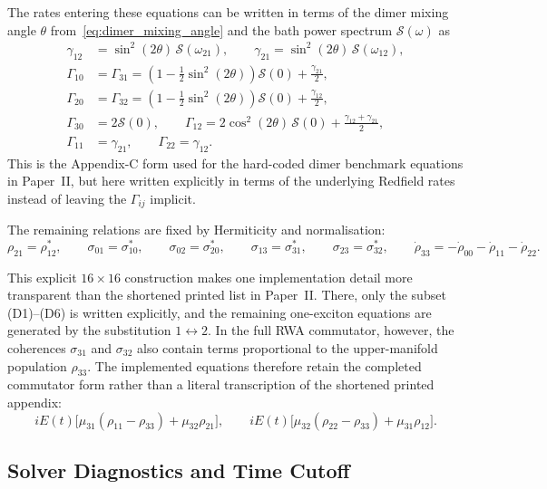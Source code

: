 The rates entering these equations can be written in terms of the dimer mixing
angle \(\theta\) from~\autoref{eq:dimer_mixing_angle} and the bath power
spectrum \(\mathcal{S}(\omega)\) as
\begin{align*}
\gamma_{12} &= \sin^{2}(2\theta)\,\mathcal{S}(\omega_{21}),
\qquad
\gamma_{21} = \sin^{2}(2\theta)\,\mathcal{S}(\omega_{12}),
\\
\Gamma_{10} &= \Gamma_{31}
= \left(1-\frac{1}{2}\sin^{2}(2\theta)\right)\mathcal{S}(0)
+ \frac{\gamma_{21}}{2},
\\
\Gamma_{20} &= \Gamma_{32}
= \left(1-\frac{1}{2}\sin^{2}(2\theta)\right)\mathcal{S}(0)
+ \frac{\gamma_{12}}{2},
\\
\Gamma_{30} &= 2\mathcal{S}(0),
\qquad
\Gamma_{12} = 2\cos^{2}(2\theta)\,\mathcal{S}(0)
+ \frac{\gamma_{12}+\gamma_{21}}{2},
\\
\Gamma_{11} &= \gamma_{21},
\qquad
\Gamma_{22} = \gamma_{12}.
\end{align*}
This is the Appendix-C form used for the hard-coded dimer benchmark equations
in Paper~II, but here written explicitly in terms of the underlying Redfield
rates instead of leaving the \(\Gamma_{ij}\) implicit.

The remaining relations are fixed by Hermiticity and normalisation:
\[
\rho_{21}=\rho_{12}^{*},
\qquad
\sigma_{01}=\sigma_{10}^{*},
\qquad
\sigma_{02}=\sigma_{20}^{*},
\qquad
\sigma_{13}=\sigma_{31}^{*},
\qquad
\sigma_{23}=\sigma_{32}^{*},
\qquad
\dot{\rho}_{33}
=
-\dot{\rho}_{00}-\dot{\rho}_{11}-\dot{\rho}_{22}.
\]

This explicit \(16\times16\) construction makes one implementation detail more
transparent than the shortened printed list in Paper~II. There, only the subset
(D1)--(D6) is written explicitly, and the remaining one-exciton equations are
generated by the substitution \(1\leftrightarrow2\). In the full RWA
commutator, however, the coherences \(\sigma_{31}\) and \(\sigma_{32}\) also
contain terms proportional to the upper-manifold population \(\rho_{33}\). The
implemented equations therefore retain the completed commutator form rather
than a literal transcription of the shortened printed appendix:
\[
iE(t)\bigl[\mu_{31}(\rho_{11}-\rho_{33})+\mu_{32}\rho_{21}\bigr],
\qquad
iE(t)\bigl[\mu_{32}(\rho_{22}-\rho_{33})+\mu_{31}\rho_{12}\bigr].
\]

\subsection{Solver Diagnostics and Time Cutoff}

